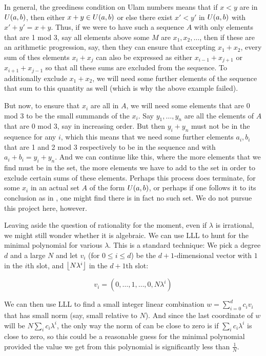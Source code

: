 \documentclass{report}
\theoremstyle{remark}
\numberwithin{equation}{section}
\begin{document}
In general, the greediness condition on Ulam numbers means that if
$x < y$ are in $U(a,b)$, then either $x+y \in U(a,b)$ or
else there exist $x' < y'$ in $U(a,b)$ with $x'+y' = x+y$.  Thus,
if we were to have such a sequence $A$ with only elements that are 1
mod 3, say all elements above some $M$ are $x_1, x_2, \ldots$, then if
these are an arithmetic progression, say, then they can ensure that
excepting $x_1 + x_2$, every sum of thes elements $x_i + x_j$ can also
be expressed as either $x_{i-1} + x_{j+1}$ or $x_{i+1}+x_{j-1}$ so
that all these sums are excluded from the sequence.  To additionally
exclude $x_1 + x_2$, we will need some further elements of the
sequence that sum to this quantity as well (which is why the above
example failed).

But now, to ensure that $x_i$ are all in $A$, we will need some
elements that are 0 mod 3 to be the small summands of the $x_i$.  Say
$y_1, \ldots, y_n$ are all the elements of $A$ that are 0 mod 3, say
in increasing order.  But then $y_i + y_n$ must not be in the sequence
for any $i$, which this means that we need some further elements
$a_i, b_i$ that are 1 and 2 mod 3 respectively to be in the sequence
and with $a_i+b_i = y_i + y_n$.  And we can continue like this, where
the more elements that we find must be in the set, the more elements
we have to add to the set in order to exclude certain sums of these
elements.  Perhaps this process does terminate, for some $x_i$ in an
actual set $A$ of the form $U(a,b)$, or perhaps if one follows it
to its conclusion as in \cite{schmerl:jct1994}, one might find
there is in fact no such set.  We do not pursue this project here,
however.  

Leaving aside the question of rationality for the moment, even if
$\lambda$ is irrational, we might still wonder whether it is
algebraic.  We can use LLL to hunt for the minimal polynomial for
various $\lambda$.  This is a standard technique: We pick a degree $d$
and a large $N$ and let $v_i$ (for $0 \leq i \leq d$) be the
$d+1$-dimensional vector with $1$ in the $i$th slot, and
$\left\lfloor N\lambda^i \right\rfloor$ in the $d+1$th slot:

\[v_i = \left(0, \ldots, 1, \ldots, 0, N\lambda^i\right)\]

We can then use LLL to find a small integer linear combination
$w = \sum_{i=0}^d c_i v_i$ that has small norm (say, small relative to
$N$).  And since the last coordinate of $w$ will be
$N \sum_i c_i \lambda^i$, the only way the norm of can be close to
zero is if $\sum_i c_i \lambda^i$ is close to zero, so this could be a
reasonable guess for the minimal polynomial provided the value we get
from this polynomial is significantly less than $\frac{1}{N}$.  
\end{document}
